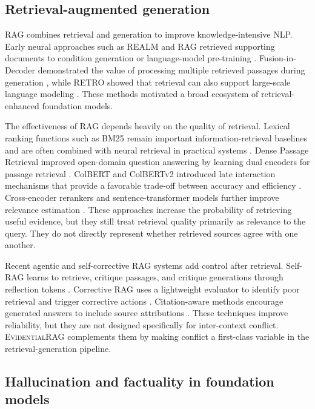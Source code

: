 \documentclass[preprint,12pt,authoryear,nopreprintline]{elsarticle}
\newcommand{\ERAG}{\textsc{EvidentialRAG}}
\begin{document}
\subsection{Retrieval-augmented generation}

RAG combines retrieval and generation to improve knowledge-intensive NLP. Early neural approaches such as REALM and RAG retrieved supporting documents to condition generation or language-model pre-training \citep{Guu2020REALM,Lewis2020RAG}. Fusion-in-Decoder demonstrated the value of processing multiple retrieved passages during generation \citep{Izacard2021FiD}, while RETRO showed that retrieval can also support large-scale language modeling \citep{Borgeaud2022RETRO}. These methods motivated a broad ecosystem of retrieval-enhanced foundation models.

The effectiveness of RAG depends heavily on the quality of retrieval. Lexical ranking functions such as BM25 remain important information-retrieval baselines and are often combined with neural retrieval in practical systems \citep{Robertson2009BM25}. Dense Passage Retrieval improved open-domain question answering by learning dual encoders for passage retrieval \citep{Karpukhin2020DPR}. ColBERT and ColBERTv2 introduced late interaction mechanisms that provide a favorable trade-off between accuracy and efficiency \citep{Khattab2020ColBERT,Santhanam2022ColBERTv2}. Cross-encoder rerankers and sentence-transformer models further improve relevance estimation \citep{Nogueira2019MonoBERT,Reimers2019SBERT}. These approaches increase the probability of retrieving useful evidence, but they still treat retrieval quality primarily as relevance to the query. They do not directly represent whether retrieved sources agree with one another.

Recent agentic and self-corrective RAG systems add control after retrieval. Self-RAG learns to retrieve, critique passages, and critique generations through reflection tokens \citep{Asai2024SelfRAG}. Corrective RAG uses a lightweight evaluator to identify poor retrieval and trigger corrective actions \citep{Yan2024CRAG}. Citation-aware methods encourage generated answers to include source attributions \citep{Gao2023ALCE}. These techniques improve reliability, but they are not designed specifically for inter-context conflict. \ERAG{} complements them by making conflict a first-class variable in the retrieval-generation pipeline.

\subsection{Hallucination and factuality in foundation models}
\end{document}
